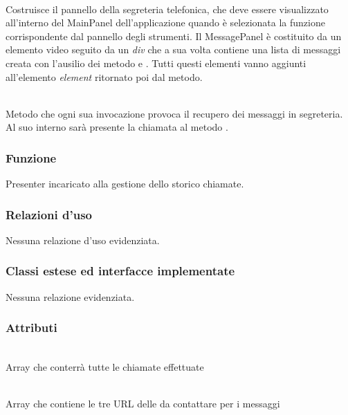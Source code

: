 \begin{description}
\item{}\\
Costruisce il pannello della segreteria telefonica, che deve essere visualizzato all'interno del MainPanel dell'applicazione quando è selezionata la funzione corrispondente dal pannello degli strumenti. Il MessagePanel è costituito da un elemento video seguito da un \textit{div} che a sua volta contiene una lista di messaggi creata con l'ausilio dei metodo  e . Tutti questi elementi vanno aggiunti all'elemento \textit{element} ritornato poi dal metodo.

\item{}\\
Metodo che ogni sua invocazione provoca il recupero dei messaggi in segreteria. Al suo interno sarà presente la chiamata al metodo .

\end{description}



\subsubsection*{Funzione}
Presenter incaricato alla gestione dello storico chiamate.

\subsubsection*{Relazioni d'uso}
Nessuna relazione d'uso evidenziata.

\subsubsection*{Classi estese ed interfacce implementate}
Nessuna relazione evidenziata.

\subsubsection*{Attributi}
\begin{description}
\item{}\\
Array che conterrà tutte le chiamate effettuate
\item{}\\
Array che contiene le tre URL delle  da contattare per i messaggi
\end{description}

